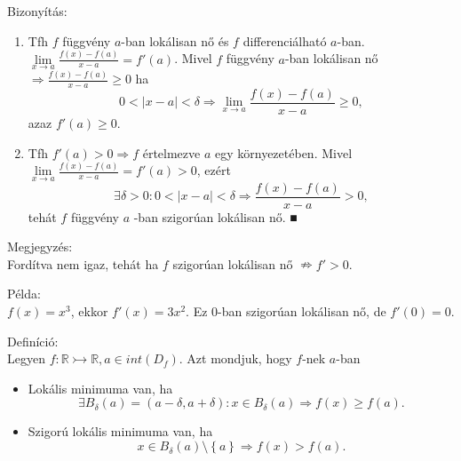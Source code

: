 \documentclass[12pt,a4paper]{scrartcl}
\providecommand{\tightlist}{%
  \setlength{\itemsep}{0pt}\setlength{\parskip}{0pt}}
\newenvironment{definicio}{}{}
\newenvironment{bizonyitas}{}{}
\newenvironment{megjegyzes}{}{}
\newenvironment{pelda}{}{}
\begin{document}
\begin{bizonyitas}

Bizonyítás:

\begin{enumerate}
\def\labelenumi{\arabic{enumi}.}
\tightlist
\item
  Tfh \(f\) függvény \(a\)-ban lokálisan nő és \(f\) differenciálható
  \(a\)-ban.
  \(\underset{x\rightarrow a}{\lim}\frac{f\left( x \right) - f\left( a \right)}{x - a} = f'\left( a \right)\).
  Mivel \(f\) függvény \(a\)-ban lokálisan nő
  \(\left. \Rightarrow\frac{f\left( x \right) - f\left( a \right)}{x - a} \geq 0 \right.\)
  ha
  \[\left. 0 < \left| {x - a} \right| < \delta\Rightarrow\underset{x\rightarrow a}{\lim}\frac{f\left( x \right) - f\left( a \right)}{x - a} \geq 0, \right.\]azaz
  \(f'\left( a \right) \geq 0\).
\item
  Tfh \(\left. f'\left( a \right) > 0\Rightarrow f \right.\) értelmezve
  \(a\) egy környezetében. Mivel
  \(\underset{x\rightarrow a}{\lim}\frac{f\left( x \right) - f\left( a \right)}{x - a} = f'\left( a \right) > 0\),
  ezért
  \[\left. \exists\delta > 0:0 < \left| {x - a} \right| < \delta\Rightarrow\frac{f\left( x \right) - f\left( a \right)}{x - a} > 0, \right.\]
  tehát \(f\) függvény \(a\) -ban szigorúan lokálisan nő. ■
\end{enumerate}

\end{bizonyitas}

\begin{megjegyzes}

Megjegyzés:\\
Fordítva nem igaz, tehát ha \(f\) szigorúan lokálisan nő
\(\nRightarrow f' > 0\).

\end{megjegyzes}

\begin{pelda}

Példa:\\
\(f\left( x \right) = x^{3}\), ekkor \(f'\left( x \right) = 3x^{2}\). Ez
0-ban szigorúan lokálisan nő, de \(f'\left( 0 \right) = 0\).

\end{pelda}

\begin{definicio}

Definíció:\\
Legyen
\(\left. f:{\mathbb{R}}\rightarrowtail{\mathbb{R}},a \in {int}\left( D_{f} \right) \right.\).
Azt mondjuk, hogy \(f\)-nek \(a\)-ban

\begin{itemize}
\tightlist
\item
  Lokális minimuma van, ha
  \[\left. \exists B_{\delta}\left( a \right) = \left( {a - \delta,a + \delta} \right):x \in B_{\delta}\left( a \right)\Rightarrow f\left( x \right) \geq f{\left( a \right).} \right.\]
\item
  Szigorú lokális minimuma van, ha
  \[\left. x \in B_{\delta}\left( a \right)\text{\textbackslash}\left\{ a \right\}\Rightarrow f\left( x \right) > f{\left( a \right).} \right.\]
\end{itemize}

\end{definicio}
\end{document}
